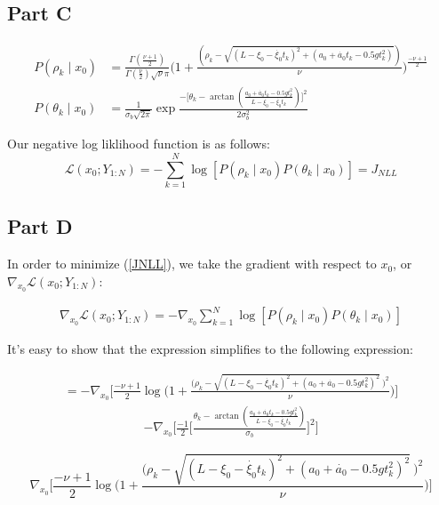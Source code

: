 \documentclass[11pt]{article}
\begin{document}
\subsection{Part C}

\begin{align}
    P(\rho_k \mid x_0) &= \frac{\Gamma(\frac{\nu + 1}{2})}{\Gamma(\frac{\nu}{2})\sqrt{\nu}\pi}\Big(1+\frac{(\rho_k - \sqrt{(L-\xi_0 - \dot{\xi_0}t_k)^2 + (a_0 + \dot{a_0}t_k - 0.5gt_k^2)})}{\nu} \Big)^{\frac{-\nu+1}{2}} \\
    P(\theta_k \mid x_0) &= \frac{1}{\sigma_b \sqrt{2\pi}} \exp{\frac{-\Big[\theta_k-\arctan(\frac{a_0+\dot{a_0}t_k-0.5gt_k^2}{L-\xi_0-\dot{\xi_0}t_k})\Big]^2}{2\sigma_b^2}}
\end{align}

Our negative log liklihood function is as follows:
\begin{equation}
    \mathcal{L}(x_0;Y_{1:N}) = - \sum_{k=1}^N \log[P(\rho_k \mid x_0) P(\theta_k \mid x_0)] = J_{NLL}
    \label{JNLL}
\end{equation}

\subsection{Part D}

In order to minimize (\ref{JNLL}), we take the gradient with respect to $x_0$, or \(\nabla_{x_0}\mathcal{L}(x_0;Y_{1:N})\):

\begin{align*}
    \nabla_{x_0}\mathcal{L}(x_0;Y_{1:N}) = -\nabla_{x_0} \sum_{k=1}^N \log[P(\rho_k \mid x_0) P(\theta_k \mid x_0)]
\end{align*}

It's easy to show that the expression simplifies to the following expression:

\begin{align*}
    = -\nabla_{x_0}\Bigg[\frac{-\nu+1}{2}\log\Bigg(1+ \frac{\Big(\rho_k - \sqrt{(L-\xi_0 - \dot{\xi_0}t_k)^2 + (a_0 + \dot{a_0} - 0.5gt_k^2)^2} \ \Big)^2}{\nu}\Bigg)\Bigg]
\end{align*}
\begin{align}
    -\nabla_{x_0}\Big[\frac{-1}{2}\Big[\frac{\theta_k - \arctan(\frac{a_0 + \dot{a_0}t_k - 0.5gt_k^2}{L-\xi_0-\dot{\xi_0}t_k})}{\sigma_b}\Big]^2\Big]
\end{align}

\[
\nabla_{x_0}\Bigg[\frac{-\nu+1}{2}\log\Bigg(1+ \frac{\Big(\rho_k - \sqrt{(L-\xi_0 - \dot{\xi_0}t_k)^2 + (a_0 + \dot{a_0} - 0.5gt_k^2)^2} \ \Big)^2}{\nu}\Bigg)\Bigg]
\]
\end{document}
